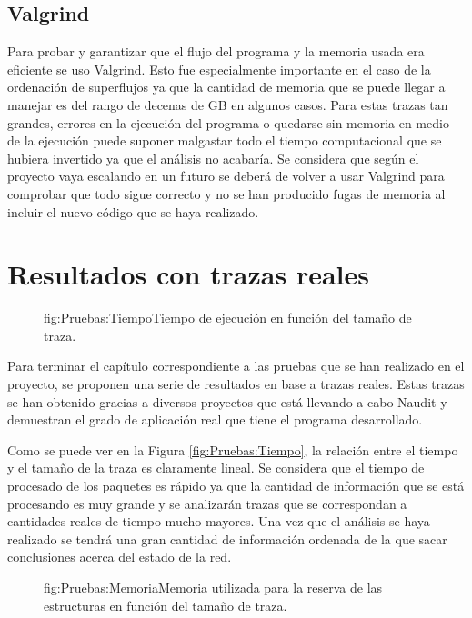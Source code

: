 \documentclass[tfg,epsbased,lof,lot,loa,covers,final,copyright,overleaf]{tfgtfmthesisuam}
\begin{document}
\subsection{Valgrind}
Para probar y garantizar que el flujo del programa y la memoria usada era eficiente se uso Valgrind. Esto fue especialmente importante en el caso de la ordenación de superflujos ya que la cantidad de memoria que se puede llegar a manejar es del rango de decenas de GB en algunos casos. Para estas trazas tan grandes, errores en la ejecución del programa o quedarse sin memoria en medio de la ejecución puede suponer malgastar todo el tiempo computacional que se hubiera invertido ya que el análisis no acabaría. Se considera que según el proyecto vaya escalando en un futuro se deberá de volver a usar Valgrind para comprobar que todo sigue correcto y no se han producido fugas de memoria al incluir el nuevo código que se haya realizado.

\section{Resultados con trazas reales}

\begin{figure}[Gráfica de tiempo de ejecución]{fig:Pruebas:Tiempo}{Tiempo de ejecución en función del tamaño de traza.}
\end{figure}

Para terminar el capítulo correspondiente a las pruebas que se han realizado en el proyecto, se proponen una serie de resultados en base a trazas reales. Estas trazas se han obtenido gracias a diversos proyectos que está llevando a cabo Naudit y demuestran el grado de aplicación real que tiene el programa desarrollado.

Como se puede ver en la Figura \ref{fig:Pruebas:Tiempo}, la relación entre el tiempo y el tamaño de la traza es claramente lineal. Se considera que el tiempo de procesado de los paquetes es rápido ya que la cantidad de información que se está procesando es muy grande y se analizarán trazas que se correspondan a cantidades reales de tiempo mucho mayores. Una vez que el análisis se haya realizado se tendrá una gran cantidad de información ordenada de la que sacar conclusiones acerca del estado de la red.

\begin{figure}[Gráfica de memoria usada]{fig:Pruebas:Memoria}{Memoria utilizada para la reserva de las estructuras en función del tamaño de traza.}
\end{figure}
\end{document}
